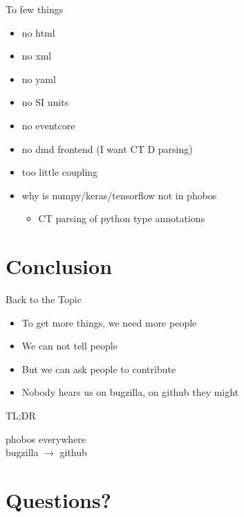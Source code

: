 \documentclass[aspectratio=169,notes]{beamer}
\begin{document}
	\begin{frame}[fragile]{To few things}
		\begin{itemize}
			\item no html
			\item no xml
			\item no yaml
			\item no SI units
			\item no eventcore
			\item no dmd frontend (I want CT D parsing)
			\item too little coupling
			\item why is numpy/keras/tensorflow not in phobos
			\pause
			\begin{itemize}
				\item CT parsing of python type annotations
			\end{itemize}
		\end{itemize}
	\end{frame}

	\section{Conclusion}
	\begin{frame}[fragile]{Back to the Topic}
		\begin{itemize}
			\item To get more things, we need more people
			\pause
			\item We can not tell people\\[1cm]
			\pause
			\item {\Large But we can ask people to contribute}\\[1cm]
			\pause
			\item {\Large Nobody hears us on bugzilla, on github they might}
		\end{itemize}
	\end{frame}
	\begin{frame}[fragile]{TL;DR}
		\Huge
		\begin{center}
		phobos everywhere\\[1cm]
		bugzilla $\rightarrow$ github\\[1cm]
		\end{center}
	\end{frame}
	\section{Questions?}
\end{document}
